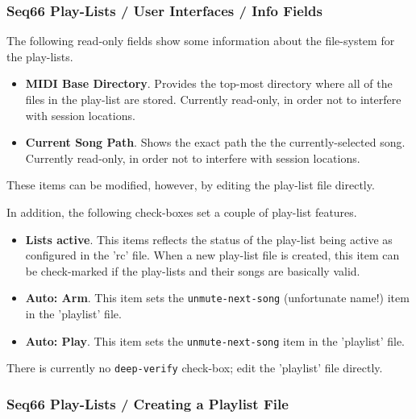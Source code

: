 \subsubsection{Seq66 Play-Lists / User Interfaces / Info Fields}
\label{subsubsec:playlist_ui_info_fields}

   The following read-only fields show some information about the file-system
   for the play-lists.

   \begin{itemize}
      \item \textbf{MIDI Base Directory}.
         Provides the top-most directory where all of the files in the
         play-list are stored.
         Currently read-only, in order not to interfere with session locations.
      \item \textbf{Current Song Path}.
         Shows the exact path the the currently-selected song.
         Currently read-only, in order not to interfere with session locations.
   \end{itemize}

   These items can be modified, however, by editing the play-list file
   directly.

   In addition, the following check-boxes set a couple of play-list features.
   
   \begin{itemize}
      \item \textbf{Lists active}.
         This items reflects the status of the play-list being active as
         configured in the 'rc' file.
         When a new play-list file is created, this item can be check-marked
         if the play-lists and their songs are basically valid.
      \item \textbf{Auto: Arm}.
         This item sets the \texttt{unmute-next-song} (unfortunate name!)
         item in the 'playlist' file.
      \item \textbf{Auto: Play}.
         This item sets the \texttt{unmute-next-song} item in the 'playlist'
         file.
   \end{itemize}

   There is currently no \texttt{deep-verify} check-box; edit the 'playlist'
   file directly.

\subsubsection{Seq66 Play-Lists / Creating a Playlist File}
\label{subsubsec:playlist_creating_playlist_file}

